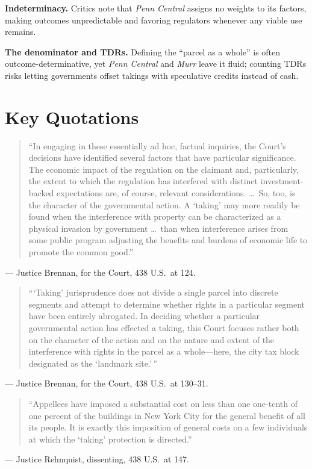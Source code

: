 \documentclass[12pt]{article}
\begin{document}
\textbf{Indeterminacy.} Critics note that \textit{Penn Central} assigns no weights to its factors, making outcomes unpredictable and favoring regulators whenever any viable use remains.

\textbf{The denominator and TDRs.} Defining the ``parcel as a whole'' is often outcome-determinative, yet \textit{Penn Central} and \textit{Murr} leave it fluid; counting TDRs risks letting governments offset takings with speculative credits instead of cash.

\section{Key Quotations}

\begin{quote}
``In engaging in these essentially ad hoc, factual inquiries, the Court's decisions have identified several factors that have particular significance. The economic impact of the regulation on the claimant and, particularly, the extent to which the regulation has interfered with distinct investment-backed expectations are, of course, relevant considerations. \dots\ So, too, is the character of the governmental action. A `taking' may more readily be found when the interference with property can be characterized as a physical invasion by government \dots\ than when interference arises from some public program adjusting the benefits and burdens of economic life to promote the common good.''
\end{quote}
\noindent --- Justice Brennan, for the Court, 438 U.S.\ at 124.

\begin{quote}
```Taking' jurisprudence does not divide a single parcel into discrete segments and attempt to determine whether rights in a particular segment have been entirely abrogated. In deciding whether a particular governmental action has effected a taking, this Court focuses rather both on the character of the action and on the nature and extent of the interference with rights in the parcel as a whole---here, the city tax block designated as the `landmark site.'\,''
\end{quote}
\noindent --- Justice Brennan, for the Court, 438 U.S.\ at 130--31.

\begin{quote}
``Appellees have imposed a substantial cost on less than one one-tenth of one percent of the buildings in New York City for the general benefit of all its people. It is exactly this imposition of general costs on a few individuals at which the `taking' protection is directed.''
\end{quote}
\noindent --- Justice Rehnquist, dissenting, 438 U.S.\ at 147.
\end{document}
